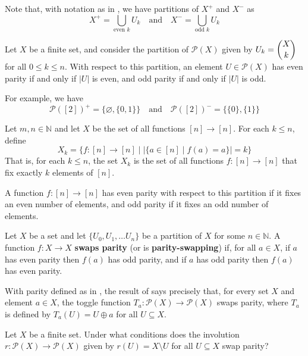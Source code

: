Note that, with notation as in , we have partitions of $X^+$ and $X^-$ as
\[ X^+ = \bigcup_{\text{even } k} U_k \quad \text{and} \quad X^- = \bigcup_{\text{odd } k} U_k \]

\begin{example}
\label{exPartitionOfPowerSetOfFiniteSet}
Let $X$ be a finite set, and consider the partition of $\mathcal{P}(X)$ given by $U_k = \dbinom{X}{k}$ for all $0 \le k \le n$. With respect to this partition, an element $U \in \mathcal{P}(X)$ has even parity if and only if $|U|$ is even, and odd parity if and only if $|U|$ is odd.

For example, we have
\[ \mathcal{P}([2])^+ = \{ \varnothing, \{ 0, 1 \} \} \quad \text{and} \quad \mathcal{P}([2])^{-} = \{ \{ 0 \}, \{ 1 \} \} \]
\end{example}

\begin{example}
\label{exPartitionOfFunctionsFromNToN}
Let $m,n \in \mathbb{N}$ and let $X$ be the set of all functions $[n] \to [n]$. For each $k \le n$, define
\[ X_k = \{ f : [n] \to [n] \mid |\{ a \in [n] \mid f(a) = a \}| = k \} \]
That is, for each $k \le n$, the set $X_k$ is the set of all functions $f : [n] \to [n]$ that fix exactly $k$ elements of $[n]$.

A function $f : [n] \to [n]$ has even parity with respect to this partition if it fixes an even number of elements, and odd parity if it fixes an odd number of elements.
\end{example}

\begin{definition}
\label{defParitySwappingFunction}
Let $X$ be a set and let $\{ U_0, U_1, \dots U_n \}$ be a partition of $X$ for some $n \in \mathbb{N}$. A function $f : X \to X$ \textbf{swaps parity} (or is \textbf{parity-swapping}) if, for all $a \in X$, if $a$ has even parity then $f(a)$ has odd parity, and if $a$ has odd parity then $f(a)$ has even parity.
\end{definition}

\begin{example}
With parity defined as in , the result of  says precisely that, for every set $X$ and element $a \in X$, the toggle function $T_a : \mathcal{P}(X) \to \mathcal{P}(X)$ swaps parity, where $T_a$ is defined by $T_a(U) = U \oplus a$ for all $U \subseteq X$.
\end{example}

\begin{exercise}
Let $X$ be a finite set. Under what conditions does the involution $r : \mathcal{P}(X) \to \mathcal{P}(X)$ given by $r(U) = X \setminus U$ for all $U \subseteq X$ swap parity?
\end{exercise}


